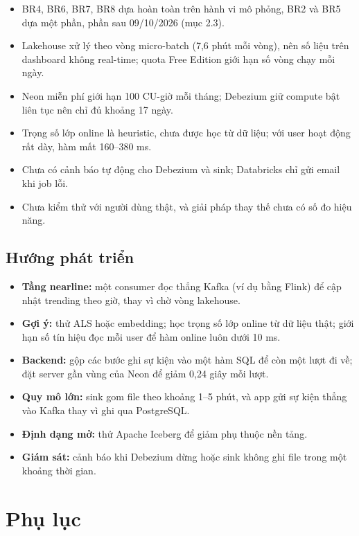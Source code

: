 \documentclass[a4paper,11pt]{article}
\begin{document}
\begin{itemize}
  \item BR4, BR6, BR7, BR8 dựa hoàn toàn trên hành vi mô phỏng, BR2 và BR5 dựa một phần, phần sau 09/10/2026 (mục 2.3).
  \item Lakehouse xử lý theo vòng micro-batch (7,6 phút mỗi vòng), nên số liệu trên dashboard không real-time; quota Free Edition giới hạn số vòng chạy mỗi ngày.
  \item Neon miễn phí giới hạn 100 CU-giờ mỗi tháng; Debezium giữ compute bật liên tục nên chỉ đủ khoảng 17 ngày.
  \item Trọng số lớp online là heuristic, chưa được học từ dữ liệu; với user hoạt động rất dày, hàm mất 160--380 ms.
  \item Chưa có cảnh báo tự động cho Debezium và sink; Databricks chỉ gửi email khi job lỗi.
  \item Chưa kiểm thử với người dùng thật, và giải pháp thay thế chưa có số đo hiệu năng.
\end{itemize}

\subsection{Hướng phát triển}\label{sec:6.4}

\begin{itemize}
  \item \textbf{Tầng nearline:} một consumer đọc thẳng Kafka (ví dụ bằng Flink) để cập nhật trending theo giờ, thay vì chờ vòng lakehouse.
  \item \textbf{Gợi ý:} thử ALS hoặc embedding; học trọng số lớp online từ dữ liệu thật; giới hạn số tín hiệu đọc mỗi user để hàm online luôn dưới 10 ms.
  \item \textbf{Backend:} gộp các bước ghi sự kiện vào một hàm SQL để còn một lượt đi về; đặt server gần vùng của Neon để giảm 0,24 giây mỗi lượt.
  \item \textbf{Quy mô lớn:} sink gom file theo khoảng 1--5 phút, và app gửi sự kiện thẳng vào Kafka thay vì ghi qua PostgreSQL.
  \item \textbf{Định dạng mở:} thử Apache Iceberg để giảm phụ thuộc nền tảng.
  \item \textbf{Giám sát:} cảnh báo khi Debezium dừng hoặc sink không ghi file trong một khoảng thời gian.
\end{itemize}

\section*{Phụ lục}
\end{document}
